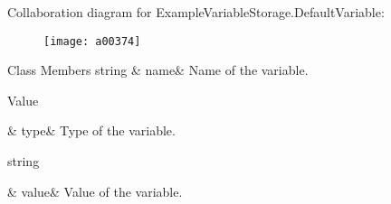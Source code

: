 Collaboration diagram for Example\-Variable\-Storage.\-Default\-Variable\-:
\nopagebreak
\begin{figure}[H]
\begin{center}
\leavevmode
\texttt{[image: a00374]}
\end{center}
\end{figure}
\begin{DoxyFields}{Class Members}
\hypertarget{a00083_a609feaa53936e7dc42248ff2ba68454a}{string}\label{a00083_a609feaa53936e7dc42248ff2ba68454a}
&
name&
Name of the variable. \\
\hline

\hypertarget{a00083_a904347efdca12f40243c7dedb646153d}{Value}\label{a00083_a904347efdca12f40243c7dedb646153d}
&
type&
Type of the variable. \\
\hline

\hypertarget{a00083_a0f00ecb21b58aa754a4bbb61edf62818}{string}\label{a00083_a0f00ecb21b58aa754a4bbb61edf62818}
&
value&
Value of the variable. \\
\hline

\end{DoxyFields}
